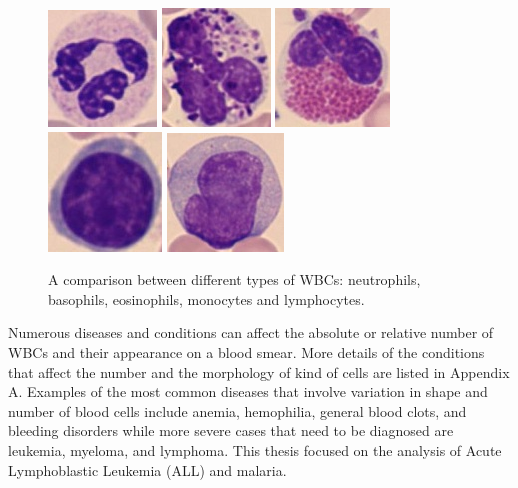 \begin{figure}[!htbp]
	\centering
	\includegraphics[height=0.125\textheight]{images/crop-Fig2-1}
	\includegraphics[height=0.125\textheight]{images/crop-Fig2-2}
	\includegraphics[height=0.125\textheight]{images/crop-Fig2-3}
	\includegraphics[height=0.125\textheight]{images/crop-Fig2-4}
	\includegraphics[height=0.125\textheight]{images/crop-Fig2-5}
	\caption[WBCs types comparison.]{\label{fig:leukocytes1}A comparison between different types of WBCs: neutrophils, basophils, eosinophils, monocytes and lymphocytes.}
\end{figure}

Numerous diseases and conditions can affect the absolute or relative number of WBCs and their appearance on a blood smear. More details of the conditions that affect the number and the morphology of kind of cells are listed in Appendix A. Examples of the most common diseases that involve variation in shape and number of blood cells include anemia, hemophilia, general blood clots, and bleeding disorders while more severe cases that need to be diagnosed are leukemia, myeloma, and lymphoma. This thesis focused on the analysis of Acute Lymphoblastic Leukemia (ALL) and malaria.

